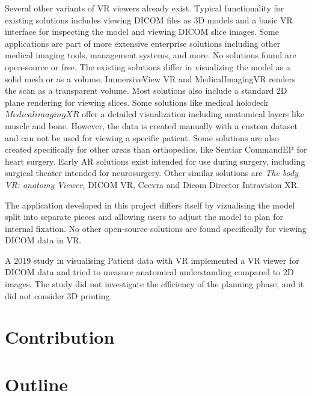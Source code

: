 \documentclass[a4paper]{report}
\begin{document}
Several other variants of VR viewers already exist. Typical functionality for existing solutions includes viewing DICOM files as 3D models and a basic VR interface for inspecting the model and viewing DICOM slice images. Some applications are part of more extensive enterprise solutions including other medical imaging tools, management systems, and more. No solutions found are open-source or free.
The existing solutions differ in visualizing the model as a solid mesh or as a volume. ImmersiveView VR\cite{noauthor_immersiveview_nodate} and MedicalImagingVR\cite{noauthor_medicalimagingvr_nodate} renders the scan as a transparent volume. Most solutions also include a standard 2D plane rendering for viewing slices.
Some solutions like medical holodeck\cite{medical_holodeck_medicalholodeck_nodate} $Medical imaging XR$ offer a detailed visualization including anatomical layers like muscle and bone. However, the data is created manually with a custom dataset and can not be used for viewing a specific patient.
Some solutions are also created specifically for other areas than orthopedics, like Sentiar CommandEP\cite{noauthor_commandep_nodate} for heart surgery.
Early AR solutions exist intended for use during surgery, including surgical theater\cite{noauthor_virtual_nodate} intended for neurosurgery\cite{anthony_patient-specific_2021}.
Other similar solutions are \emph{The body VR: anatomy Viewer}\cite{noauthor_body_nodate}, DICOM VR\cite{noauthor_dicom_nodate-1}, Ceevra\cite{ceevra_inc_using_2019} and Dicom Director Intravision XR\cite{dicomdirectorcom_surgeons_nodate}.

The application developed in this project differs itself by vizualising the model split into separate pieces and allowing users to adjust the model to plan for internal fixation.
No other open-source solutions are found specifically for viewing DICOM data in VR.

A 2019 study in visualising Patient data with VR\cite{vertemati_virtual_2019} implemented a VR viewer for DICOM data and tried to measure anatomical understanding compared to 2D images. The study did not investigate the efficiency of the planning phase, and it did not consider 3D printing.

\section{Contribution}
\section{Outline}
\end{document}
